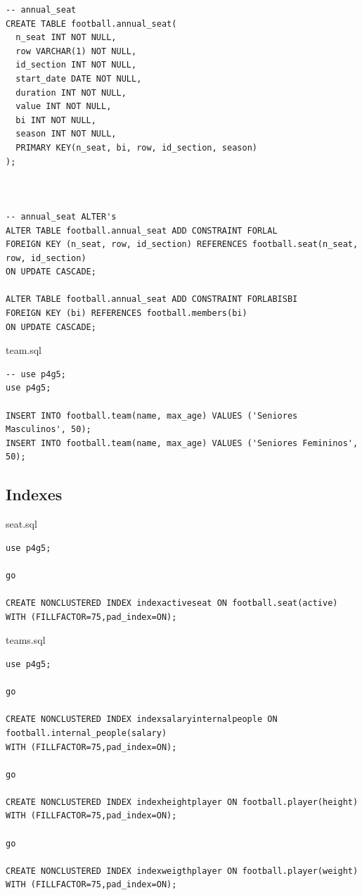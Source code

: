 \documentclass[pdftex,12pt,a4paper]{report}
\begin{document}
\begin{lstlisting}
-- annual_seat
CREATE TABLE football.annual_seat(
  n_seat INT NOT NULL,
  row VARCHAR(1) NOT NULL,
  id_section INT NOT NULL,
  start_date DATE NOT NULL,
  duration INT NOT NULL,
  value INT NOT NULL,
  bi INT NOT NULL,
  season INT NOT NULL,
  PRIMARY KEY(n_seat, bi, row, id_section, season)
);



-- annual_seat ALTER's
ALTER TABLE football.annual_seat ADD CONSTRAINT FORLAL
FOREIGN KEY (n_seat, row, id_section) REFERENCES football.seat(n_seat, row, id_section)
ON UPDATE CASCADE;

ALTER TABLE football.annual_seat ADD CONSTRAINT FORLABISBI
FOREIGN KEY (bi) REFERENCES football.members(bi)
ON UPDATE CASCADE;

\end{lstlisting}

team.sql
\begin{lstlisting} 
-- use p4g5;
use p4g5;

INSERT INTO football.team(name, max_age) VALUES ('Seniores Masculinos', 50);
INSERT INTO football.team(name, max_age) VALUES ('Seniores Femininos', 50);

\end{lstlisting}

\newpage
\subsection*{Indexes}
seat.sql
\begin{lstlisting} 
use p4g5;

go

CREATE NONCLUSTERED INDEX indexactiveseat ON football.seat(active)
WITH (FILLFACTOR=75,pad_index=ON);

\end{lstlisting}

teams.sql
\begin{lstlisting} 
use p4g5;

go

CREATE NONCLUSTERED INDEX indexsalaryinternalpeople ON football.internal_people(salary)
WITH (FILLFACTOR=75,pad_index=ON);

go

CREATE NONCLUSTERED INDEX indexheightplayer ON football.player(height)
WITH (FILLFACTOR=75,pad_index=ON);

go

CREATE NONCLUSTERED INDEX indexweigthplayer ON football.player(weight)
WITH (FILLFACTOR=75,pad_index=ON);
\end{lstlisting}
\end{document}
